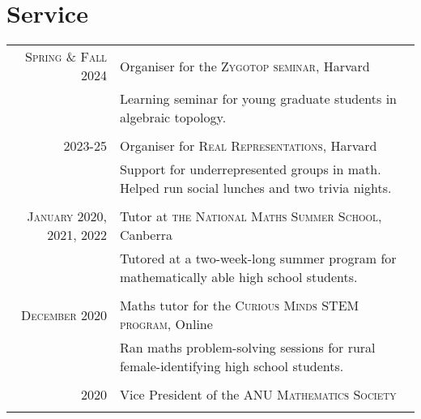 \documentclass[a4paper,11pt]{article} %
\begin{document}
\section{Service}

\begin{tabular}{r|p{12cm}}

\textsc{Spring \& Fall 2024} & Organiser for the \textsc{Zygotop seminar}, Harvard \emph{}\\
& \footnotesize{Learning seminar for young graduate students in algebraic topology.}\\
\multicolumn{2}{c}{} \\


\textsc{2023-25} & Organiser for \textsc{Real Representations}, Harvard \emph{}\\
& \footnotesize{Support for underrepresented groups in math. Helped run social lunches and two trivia nights.}\\
\multicolumn{2}{c}{} \\


\textsc{January 2020, 2021, 2022} & Tutor at \textsc{the National Maths Summer School}, Canberra \emph{}\\
& \footnotesize{Tutored at a two-week-long summer program for mathematically able high school students.}\\
\multicolumn{2}{c}{} \\


\textsc{December 2020} & Maths tutor for the \textsc{Curious Minds STEM program}, Online \emph{}\\
& \footnotesize{Ran maths problem-solving sessions for rural female-identifying high school students.}\\
\multicolumn{2}{c}{} \\


\textsc{2020} & Vice President of the \textsc{ANU Mathematics Society}\\
\multicolumn{2}{c}{} \\



\end{tabular}
\end{document}
